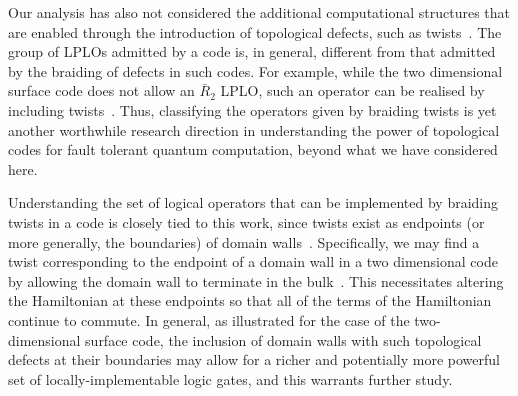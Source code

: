\documentclass[pra,twocolumn,a4paper,nofootinbib]{revtex4-1}
\begin{document}
Our analysis has also not considered the additional computational structures that are enabled through the introduction of topological defects, such as twists~\cite{BombinTwist, BombinTwist2, Brown}. The group of LPLOs admitted by a code is, in general, different from that admitted by the braiding of defects in such codes. For example, while the two dimensional surface code does not allow an $\bar{R}_2$ LPLO, such an operator can be realised by including twists~\cite{BombinTwist, Brown}. Thus, classifying the operators given by braiding twists is yet another worthwhile research direction in understanding the power of topological codes for fault tolerant quantum computation, beyond what we have considered here. 

Understanding the set of logical operators that can be implemented by braiding twists in a code is closely tied to this work, since twists exist as endpoints (or more generally, the boundaries) of domain walls~\cite{BombinTwist, Barkeshli}. Specifically, we may find a twist corresponding to the endpoint of a domain wall in a two dimensional code by allowing the domain wall to terminate in the bulk~\cite{Bridgeman}.  This necessitates altering the Hamiltonian at these endpoints so that all of the terms of the Hamiltonian continue to commute.  In general, as illustrated for the case of the two-dimensional surface code, the inclusion of domain walls with such topological defects at their boundaries may allow for a richer and potentially more powerful set of locally-implementable logic gates, and this warrants further study.
\end{document}
